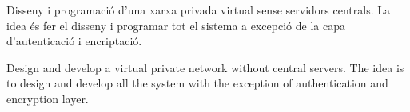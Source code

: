 \documentclass[a4paper,12pt,catalan,final]{epsc/epsc_tfc_pfc}
\begin{document}
\pagestyle{empty}


\portada

\begin{resum}{17cm}
Disseny i programació d'una xarxa privada virtual sense servidors centrals. La idea és fer el disseny i programar tot el sistema a excepció de la capa d'autenticació i encriptació.
\end{resum}

\begin{overview}{17cm}
Design and develop a virtual private network without central servers. The idea is to design and develop all the system with the exception of authentication and encryption layer.
\end{overview}


\thispagestyle{empty} 
\tableofcontents
\cleardoublepage

\thispagestyle{empty}
\listoffigures
\cleardoublepage
\end{document}
